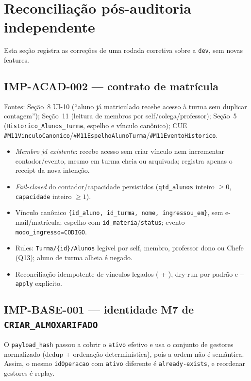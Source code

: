 \section{Reconciliação pós-auditoria independente}

Esta seção registra as correções de uma rodada corretiva sobre a
\texttt{dev}, sem novas features.

\subsection{IMP-ACAD-002 --- contrato de matrícula}

Fontes: Seção~8 UI-10 (``aluno já matriculado recebe acesso à turma sem duplicar
contagem''); Seção~11 (leitura de membros por self/colega/professor); Seção~5
(\texttt{Historico\_Alunos\_Turma}, espelho e vínculo canônico); CUE
\texttt{\#M11VinculoCanonico}/\texttt{\#M11EspelhoAlunoTurma}/\texttt{\#M11EventoHistorico}.

\begin{itemize}
  \item \emph{Membro já existente}: recebe acesso sem criar vínculo nem
  incrementar contador/evento, mesmo em turma cheia ou arquivada; registra
  apenas o receipt da nova intenção.
  \item \emph{Fail-closed} do contador/capacidade persistidos
  (\texttt{qtd\_alunos} inteiro $\ge 0$, \texttt{capacidade} inteiro $\ge 1$).
  \item Vínculo canônico \texttt{\{id\_aluno, id\_turma, nome, ingressou\_em\}},
  sem e-mail/matrícula; espelho com \texttt{id\_materia}/\texttt{status};
  evento \texttt{modo\_ingresso=CODIGO}.
  \item Rules: \texttt{Turma/\{id\}/Alunos} legível por self, membro, professor
  dono ou Chefe (Q13); aluno de turma alheia é negado.
  \item Reconciliação idempotente de vínculos legados
  ( +
  ), dry-run por padrão e
  \texttt{--apply} explícito.
\end{itemize}

\subsection{IMP-BASE-001 --- identidade M7 de \texttt{CRIAR\_ALMOXARIFADO}}

O \texttt{payload\_hash} passou a cobrir o \texttt{ativo} efetivo e usa o
conjunto de gestores normalizado (dedup + ordenação determinística), pois a
ordem não é semântica. Assim, o mesmo \texttt{idOperacao} com \texttt{ativo}
diferente é \texttt{already-exists}, e reordenar gestores é replay.

